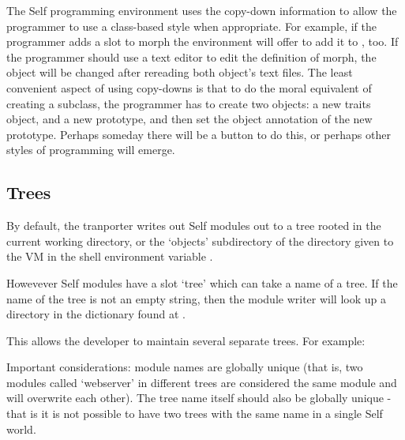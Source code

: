 \documentclass[letterpaper,10pt,english]{sphinxmanual}
\begin{document}
The Self programming environment uses the copy-down information to allow the programmer
to use a class-based style when appropriate. For example, if the programmer adds a slot to morph
the environment will offer to add it to , too. If the programmer should use a text editor
to edit the definition of morph, the  object will be changed after rereading both object’s
text files. The least convenient aspect of using copy-downs is that to do the moral equivalent
of creating a subclass, the programmer has to create two objects: a new traits object, and a new prototype,
and then set the object annotation of the new prototype. Perhaps someday there will be a
button to do this, or perhaps other styles of programming will emerge.


\subsection{Trees}
\label{\detokenize{howtoprg:trees}}
By default, the tranporter writes out Self modules out to a tree rooted in the current working directory, or the `objects' subdirectory of the directory given to the VM in the shell environment variable .

Howevever Self modules have a slot `tree' which can take a name of a tree. If the name of the tree is not an empty string, then the module writer will look up a directory in the dictionary found at .

This allows the developer to maintain several separate trees. For example:

\begin{sphinxVerbatim}[commandchars=\\\{\}]
 
   
             

  
         
\end{sphinxVerbatim}

Important considerations: module names are globally unique (that is, two modules called `webserver' in different trees are considered the same module and will overwrite each other). The tree name itself should also be globally unique - that is it is not possible to have two trees with the same name in a single Self world.
\end{document}
